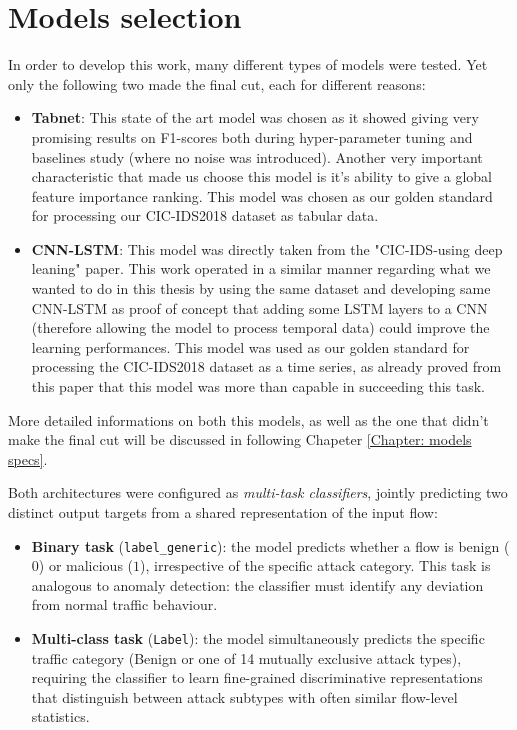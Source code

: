 \documentclass[../main.tex]{subfiles}
\begin{document}
\newpage
\section{Models selection}
\label{Chap: model selection}

In order to develop this work, many different types of models were tested. Yet only the following two made the final cut, each for different reasons:
\begin{itemize}
    \item \textbf{Tabnet}: This state of the art model was chosen as it showed giving very promising results on F1-scores both during hyper-parameter tuning and baselines study (where no noise was introduced). Another very important characteristic that made us choose this model is it's ability to give a global feature importance ranking. This model was chosen as our golden standard for processing our CIC-IDS2018 dataset as tabular data.
    \item \textbf{CNN-LSTM}: This model was directly taken from the "CIC-IDS-using deep leaning"\supercite{jablaoui2024effective} paper. This work operated in a similar manner regarding what we wanted to do in this thesis by using the same dataset and developing same CNN-LSTM as proof of concept that adding some LSTM layers to a CNN (therefore allowing the model to process temporal data) could improve the learning performances. This model was used as our golden standard for processing the CIC-IDS2018 dataset as a time series, as already proved from this paper that this model was more than capable in succeeding this task. 
\end{itemize}

More detailed informations on both this models, as well as the one that didn't make the final cut will be discussed in following Chapeter \ref{Chapter: models specs}.

Both architectures were configured as \emph{multi-task classifiers}, jointly predicting two distinct output targets from a shared representation of the input flow:

\begin{itemize}
    \item \textbf{Binary task} (\texttt{label\_generic}): the model predicts whether a flow is benign ($0$) or malicious ($1$), irrespective of the specific attack category. This task is analogous to anomaly detection: the classifier must identify any deviation from normal traffic behaviour.
    \item \textbf{Multi-class task} (\texttt{Label}): the model simultaneously predicts the specific traffic category (Benign or one of 14 mutually exclusive attack types), requiring the classifier to learn fine-grained discriminative representations that distinguish between attack subtypes with often similar flow-level statistics.
\end{itemize}
\end{document}
